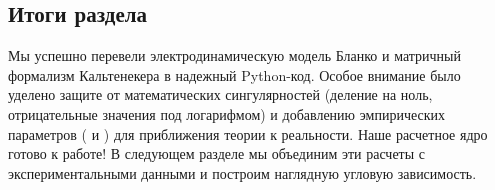 \subsection{Итоги раздела}
Мы успешно перевели электродинамическую модель Бланко и матричный формализм Кальтенекера в надежный Python-код. Особое внимание было уделено защите от математических сингулярностей (деление на ноль, отрицательные значения под логарифмом) и добавлению эмпирических параметров ( и ) для приближения теории к реальности. Наше расчетное ядро  готово к работе! В следующем разделе мы объединим эти расчеты с экспериментальными данными и построим наглядную угловую зависимость.
